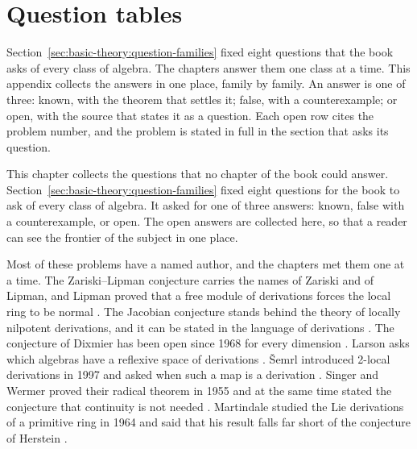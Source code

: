 \chapter{Question tables}\label{app:questions}
%

Section~\ref{sec:basic-theory:question-families} fixed eight questions that the
book asks of every class of algebra.
The chapters answer them one class at a time.
This appendix collects the answers in one place, family by family.
An answer is one of three: known, with the theorem that settles it; false, with
a counterexample; or open, with the source that states it as a question.
Each open row cites the problem number, and the problem is stated in full in
the section that asks its question.

This chapter collects the questions that no chapter of the book could answer.
Section~\ref{sec:basic-theory:question-families} fixed eight questions for the
book to ask of every class of algebra. %
It asked for one of three answers: known, false with a counterexample, or open.
The open answers are collected here, so that a reader can see the frontier of
the subject in one place.


Most of these problems have a named author, and the chapters met them one
at a time.
The Zariski--Lipman conjecture carries the names of Zariski and of Lipman, and
Lipman proved that a free module of derivations forces the local ring to be
normal \cite[p.~270]{BiswasGurjarKolte2014}.
The Jacobian conjecture stands behind the theory of locally nilpotent
derivations, and it can be stated in the language of derivations
\cite[p.~81]{Freudenburg2017}.
The conjecture of Dixmier has been open since 1968 for every dimension
\cite[pp.~1--2]{Bavula2017}.
Larson asks which algebras have a reflexive space of derivations
\cite[p.~703]{HadwinLi2004}.
\v{S}emrl introduced 2-local derivations in 1997 and asked when such a map is a
derivation \cite[p.~1]{AyupovYusupov2020}.
Singer and Wermer proved their radical theorem in 1955 and at the same time
stated the conjecture that continuity is not needed
\cite[p.~710]{BresarVillena2002}.
Martindale studied the Lie derivations of a primitive ring in 1964 and said that
his result falls far short of the conjecture of Herstein
\cite[p.~183]{Martindale1964}.

